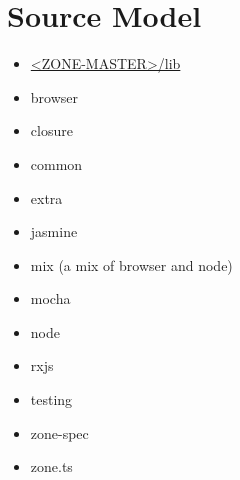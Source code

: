 \section{Source Model}


\begin{itemize}
  \item \href{https://github.com/angular/zone.js/tree/master/lib/zone-spec}
        {<ZONE-MASTER>/lib}
\end{itemize}


\begin{itemize}
  \item browser
  \item closure
  \item common
  \item extra
  \item jasmine
  \item mix (a mix of browser and node)
  \item mocha
  \item node
  \item rxjs
  \item testing
  \item zone-spec
\end{itemize}


\begin{itemize}
  \item zone.ts
\end{itemize}





